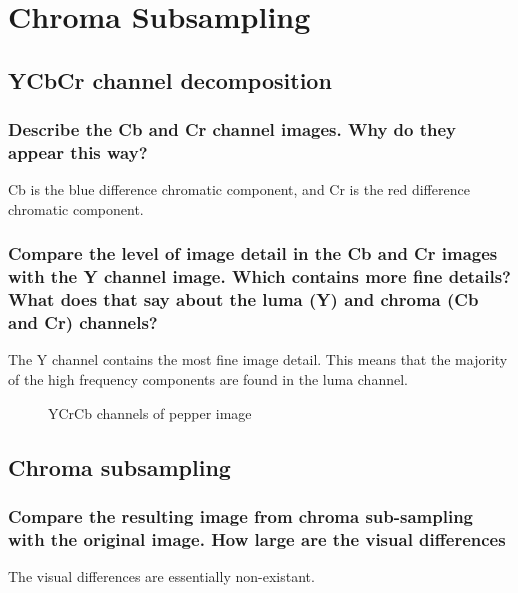 \section{Chroma Subsampling}


\subsection{YCbCr channel decomposition}

\subsubsection{Describe the Cb and Cr channel images. Why do they appear this way?}
Cb is the blue difference chromatic component, and Cr is the red difference chromatic component.

\subsubsection{Compare the level of image detail in the Cb and Cr images with the Y channel image. Which contains more fine details? What does that say about the luma (Y) and chroma (Cb and Cr) channels?}

The Y channel contains the most fine image detail. This means that the majority of the high frequency components are found in the luma channel.

\begin{figure}[ht]
\centering
	\caption{YCrCb channels of pepper image}
	\label{fig:noiseGeneration.toy}
\end{figure}	
	

\clearpage
\subsection{Chroma subsampling}
\subsubsection{Compare the resulting image from chroma sub-sampling with the original image. How large are the
visual differences}
The visual differences are essentially non-existant.

